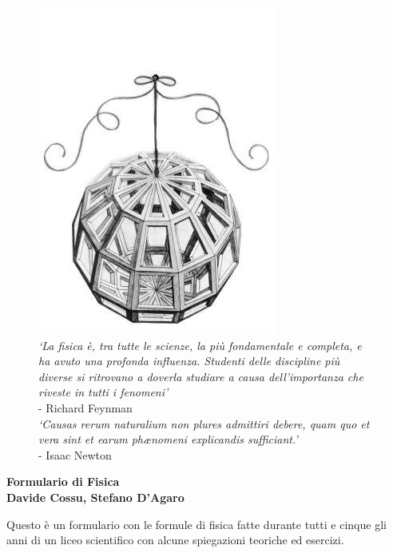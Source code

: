 \documentclass[8pt, a4paper, twocolumn, usenames, dvipsnames]{extarticle}
\begin{document}
\onecolumn
\begin{@twocolumnfalse}
		\clearpage
		\begin{center}
			\begin{figure}[!h]
				\centering
                                \captionsetup{justification=centering}
				\includegraphics[scale=3]{colophon/daVinci}
				\caption{\textit{`La fisica è, tra tutte le scienze, la più fondamentale e completa,
						e ha avuto una profonda influenza. Studenti delle discipline più diverse si 
						ritrovano a doverla studiare a causa dell'importanza che riveste in tutti i 
						fenomeni'}\\- Richard Feynman\\ [\baselineskip]
					\textit{`Causas rerum naturalium non plures admittiri debere, quam quo et vera 
						sint et earum ph\ae nomeni explicandis sufficiant.'}\\- Isaac Newton}
				\label{fig:deer}
			\end{figure}
			\vspace{1cm}
			\begin{minipage}{.6\textwidth}				
				\begin{center}
					{\Huge\textbf{Formulario di Fisica}}\\\vspace{0.2cm}
					{\textbf{Davide Cossu, Stefano D'Agaro}}
				\end{center}
				\vspace{0.5cm}
				Questo è un formulario con le formule di fisica fatte durante tutti e cinque gli anni 
				di un liceo scientifico con alcune spiegazioni teoriche ed esercizi.
			\end{minipage}
		\end{center}
		\clearpage
\end{@twocolumnfalse}
\end{document}
